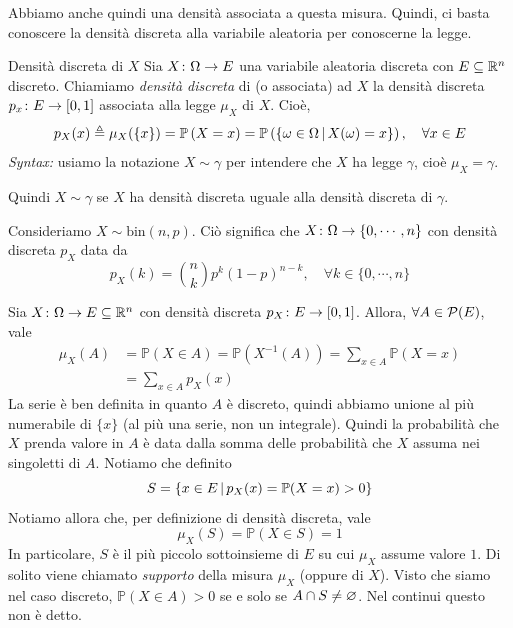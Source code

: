 \documentclass[a4paper]{article}
\begin{document}
Abbiamo anche quindi una densità associata a questa misura.
Quindi, ci basta conoscere la densità discreta alla variabile aleatoria per conoscerne la legge.

\begin{snippetdefinition}{Densità discreta di \(X\)}
    Sia \(X \colon \Omega \to E\) una variabile aleatoria discreta con \(E \subseteq \mathbb{R}^n\)
    discreto. Chiamiamo \emph{densità discreta} di (o associata)
    ad \(X\) la densità discreta \(p_x \colon E \to [0,1]\)
    associata alla legge
    \(\mu_X\) di \(X\). Cioè,
    \[
        p_X(x) \triangleq
        \mu_X(\{x\}) = \mathbb P \left(X = x\right)
        = \mathbb P \left(
            \left\{\omega\in \Omega
                \,|\, X(\omega) = x
            \right\}
        \right), \quad \forall x \in E
    \]
    \emph{Syntax:} usiamo la notazione \(X \sim \gamma\)
    per intendere che \(X\) ha legge \(\gamma\), cioè \(\mu_X = \gamma\).
\end{snippetdefinition}

Quindi \(X \sim \gamma\) se \(X\) ha densità discreta
uguale alla densità discreta di \(\gamma\).

\begin{snippetexample}{}
    Consideriamo \(X \sim \text{bin}(n,p)\).
    Ciò significa che \(X \colon \Omega \to \{0, \cdots, n\}\)
    con densità discreta
    \(p_X\) data da \[
        p_X(k) = \binom{n}{k} p^k(1-p)^{n-k},
        \quad \forall k \in \{0, \cdots, n\}
    \]
\end{snippetexample}

Sia \(X \colon \Omega \to E \subseteq \mathbb{R}^n\)
con densità discreta \(p_X \colon E \to [0,1]\).
Allora, \(\forall A \in \mathcal P(E)\), vale
\begin{align*}
    \mu_X(A) &= \mathbb P(X \in A)
    = \mathbb P(X^{-1}(A)) = \sum_{x \in A} \mathbb P(X = x) \\
    &= \sum_{x \in A} p_X(x)
\end{align*}
La serie è ben definita in quanto \(A\) è discreto, quindi abbiamo unione al più numerabile
di \(\{x\}\) (al più una serie, non un integrale).
Quindi la probabilità che \(X\) prenda valore in \(A\) è data
dalla somma delle probabilità che \(X\)
assuma nei singoletti di \(A\).
Notiamo che definito
\[
    S = \{x \in E \,|\, p_X(x) = \mathbb P(X = x) > 0 \}
\]
Notiamo allora che, per definizione di densità discreta, vale
\[
    \mu_X(S) = \mathbb P(X \in S) = 1
\]
In particolare, \(S\) è il più piccolo sottoinsieme
di \(E\) su cui \(\mu_X\) assume valore \(1\).
Di solito viene chiamato \emph{supporto} della misura \(\mu_X\)
(oppure di \(X\)).
Visto che siamo nel caso discreto, \(\mathbb P(X \in A) > 0\)
se e solo se \(A \cap S \neq \varnothing\).
Nel continui questo non è detto.
\end{document}
